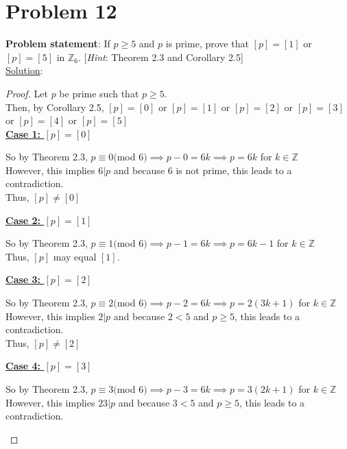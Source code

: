 \documentclass{article} %
\begin{document}
\newpage

\section*{Problem 12}


\textbf{Problem statement}: If $p \geq 5$ and $p$ is prime, prove that $[p] = [1]$ or $[p] = [5]$ in $\mathbb{Z}_6$. [\textit{Hint}: Theorem 2.3 and Corollary 2.5]
\\

\underline{Solution}: 
\begin{addmargin}[1em]{0em}
\begin{proof}
Let $p$ be prime such that $p \geq 5$.
\\Then, by Corollary 2.5, $[p]= [0]$ or $[p]= [1]$ or $[p]= [2]$ or $[p]= [3]$ or $[p]= [4]$ or $[p]= [5]$
\\ \underline{\textbf{Case 1: $[p] = [0]$}}
\begin{addmargin}[1em]{0em}
So by Theorem 2.3, $p \equiv 0($mod $6) \implies p - 0 = 6k \implies p = 6k$ for $k \in \mathbb{Z}$
\\However, this implies $6|p$ and because 6 is not prime, this leads to a contradiction.
\\Thus, $[p] \neq [0]$
\end{addmargin}
\underline{\textbf{Case 2: $[p] = [1]$}}
\begin{addmargin}[1em]{0em}
So by Theorem 2.3, $p \equiv 1($mod $6) \implies p - 1 = 6k \implies p = 6k - 1$ for $k \in \mathbb{Z}$
\\Thus, $[p]$ may equal $[1]$.
\end{addmargin}
\underline{\textbf{Case 3: $[p] = [2]$}}
\begin{addmargin}[1em]{0em}
So by Theorem 2.3, $p \equiv 2($mod $6) \implies p - 2 = 6k \implies p = 2(3k + 1)$ for $k \in \mathbb{Z}$
\\However, this implies $2|p$ and because $2 < 5$ and $p \geq 5$, this leads to a contradiction.
\\Thus, $[p] \neq [2]$
\end{addmargin}
\underline{\textbf{Case 4: $[p] = [3]$}}
\begin{addmargin}[1em]{0em}
So by Theorem 2.3, $p \equiv 3($mod $6) \implies p - 3 = 6k \implies p = 3(2k + 1)$ for $k \in \mathbb{Z}$
\\However, this implies $23|p$ and because $3 < 5$ and $p \geq 5$, this leads to a contradiction.

\end{addmargin}
\end{proof}
\end{addmargin}
\end{document}
